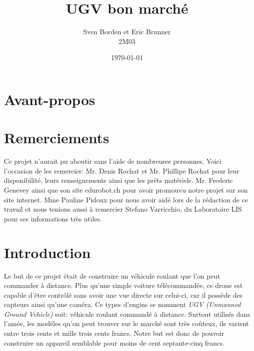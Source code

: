 \documentclass[a4paper,12pt]{article}
\begin{document}
{\selectfont %
\title{UGV bon marché}
\author{Sven Borden et Eric Brunner\\2M03}
\date{\today}
\maketitle
\clearpage

\section*{Avant-propos}

\clearpage

\section*{Remerciements}
Ce projet n'aurait pu aboutir sans l'aide de nombreuses personnes. Voici l'occasion de les remercier: Mr. Denis Rochat et Mr. Phillipe Rochat pour leur disponibilité, leurs renseignements ainsi que les prêts matériels. Mr. Frederic Genevey ainsi que son site edurobot.ch pour avoir promouvu notre projet sur son site internet. Mme Pauline Pidoux pour nous avoir aidé lors de la rédaction de ce travail et nous tenions aussi à remercier Stefano Varricchio, du Laboratoire LIS pour ses informations très utiles.

\clearpage

\tableofcontents
\clearpage



\section*{Introduction}
Le but de ce projet était de construire un véhicule roulant que l'on peut commander à distance. Plus qu'une simple voiture télécommandée, ce drone est capable d'être contrôlé sans avoir une vue directe sur celui-ci, car il possède des capteurs ainsi qu'une caméra. Ce types d'engins se nomment \textit{UGV (Unmanned Ground Vehicle)} soit: véhicule roulant commandé à distance. Surtout utilisés dans l'amée, les modèles qu'on peut trouver sur le marché sont très coûteux, ils varient entre trois cents et mille trois cents francs. Notre but est donc de pouvoir construire un appareil semblable pour moins de cent septante-cinq francs. 

}
\end{document}
